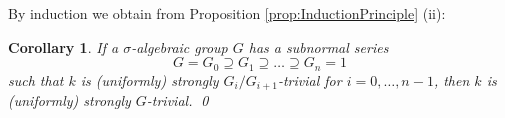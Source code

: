 \documentclass[oneside,reqno]{amsart}
\newtheorem{lemma}[theo]{Lemma}
\newtheorem{cor}[theo]{Corollary}
\theoremstyle{definition}
\newcommand{\s}{\sigma}
\newcommand{\pis}{\pi_0^\sigma}
\newcommand{\ks}{$k$\=/$\s$}
\newcommand{\ssetale}{{strongly $\sigma$-\'{e}tale}}
\begin{document}
By induction we obtain from Proposition \ref{prop:InductionPrinciple} (ii):

\begin{cor} \label{cor: strong induction for tower} 
	If a $\s$-algebraic group $G$ has a subnormal series
	$$G=G_0\supseteq G_1\supseteq\ldots\supseteq G_n=1$$ such that $k$ is (uniformly) strongly $G_i/G_{i+1}$-trivial for $i=0,\ldots,n-1$, then $k$ is (uniformly) strongly $G$-trivial. \qed 
\end{cor}



	

%
%
%
%
%
%
%
%
%
%
\end{document}
